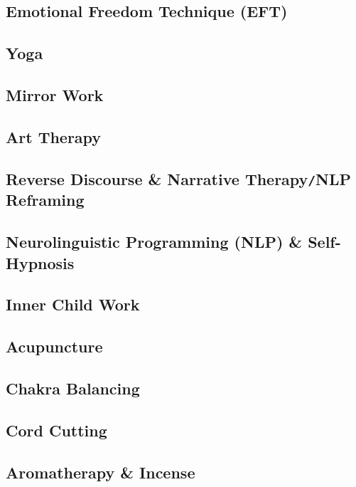 \documentclass[oneside]{book}
\numberwithin{equation}{section}
\begin{document}
\subsection{Emotional Freedom Technique (EFT)}

\subsection{Yoga}

\subsection{Mirror Work}

\subsection{Art Therapy}

\subsection{Reverse Discourse \& Narrative Therapy\texttt{/}NLP Reframing}

\subsection{Neurolinguistic Programming (NLP) \& Self-Hypnosis}

\subsection{Inner Child Work}

\subsection{Acupuncture}

\subsection{Chakra Balancing}

\subsection{Cord Cutting}

\subsection{Aromatherapy \& Incense}
\end{document}
